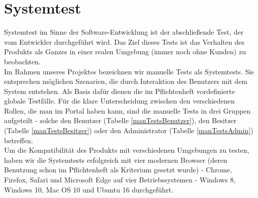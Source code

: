 \documentclass[parskip=full,11pt]{scrartcl}
\begin{document}
\newpage
\section{Systemtest} \label{systemtest}
Systemtest im Sinne der Software-Entwicklung ist der abschlie{\ss}ende Test, der vom Entwickler durchgeführt wird. Das Ziel dieses Tests ist das Verhalten des Produkts als Ganzes in einer realen Umgebung (immer noch ohne Kunden) zu beobachten.\\
Im Rahmen unseres Projektes bezeichnen wir manuelle Tests als Systemtests. Sie entsprechen möglichen Szenarien, die durch Interaktion des Benutzers mit dem System entstehen. Als Basis dafür dienen die im Pflichtenheft vordefinierte globale Testfälle. Für die klare Unterscheidung zwischen den verschiedenen Rollen, die man im Portal haben kann, sind die manuelle Tests in drei Gruppen aufgeteilt - solche den Benutzer (Tabelle \ref{manTestsBenutzer}), den Besitzer (Tabelle \ref{manTestsBesitzer}) oder den Administrator (Tabelle \ref{manTestsAdmin}) betreffen.\\
Um die Kompatibilität des Produkts mit verschiedenen Umgebungen zu testen, haben wir die Systemtests erfolgreich mit vier modernen Browser (deren Benutzung schon im Pflichtenheft als Kriterium gesetzt wurde) - Chrome, Firefox, Safari und Microsoft Edge auf vier Betriebssystemen - Windows 8, Windows 10, Mac OS 10 und Ubuntu 16 durchgeführt.  
\end{document}
